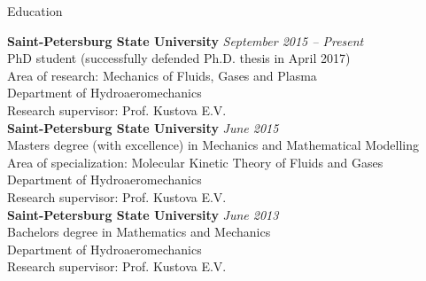 \documentclass{resume} %
\begin{document}

\begin{rSection}{Education}

{\bf Saint-Petersburg State University} \hfill {\em September 2015 -- Present} \\ 
PhD student (successfully defended Ph.D. thesis in April 2017)\\
Area of research: Mechanics of Fluids, Gases and Plasma \\
Department of Hydroaeromechanics \smallskip \\
Research supervisor: Prof. Kustova E.V. \\

{\bf Saint-Petersburg State University} \hfill {\em June 2015} \\ 
Masters degree (with excellence) in Mechanics and Mathematical Modelling\\
Area of specialization: Molecular Kinetic Theory of Fluids and Gases\\
Department of Hydroaeromechanics \smallskip \\
Research supervisor: Prof. Kustova E.V. \\

{\bf Saint-Petersburg State University} \hfill {\em June 2013} \\ 
Bachelors degree in Mathematics and Mechanics \\
Department of Hydroaeromechanics \smallskip \\
Research supervisor: Prof. Kustova E.V. \\

\end{rSection}
\end{document}
